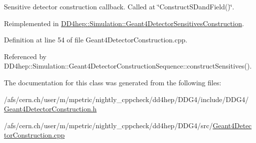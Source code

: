 Sensitive detector construction callback. Called at \char`\"{}ConstructSDandField()\char`\"{}. 

Reimplemented in \hyperlink{class_d_d4hep_1_1_simulation_1_1_geant4_detector_sensitives_construction_ae698013abe689d2e76e1423d5e08f246}{DD4hep::Simulation::Geant4DetectorSensitivesConstruction}.

Definition at line 54 of file Geant4DetectorConstruction.cpp.

Referenced by DD4hep::Simulation::Geant4DetectorConstructionSequence::constructSensitives().

The documentation for this class was generated from the following files:\begin{DoxyCompactItemize}
\item 
/afs/cern.ch/user/m/mpetric/nightly\_\-cppcheck/dd4hep/DDG4/include/DDG4/\hyperlink{_geant4_detector_construction_8h}{Geant4DetectorConstruction.h}\item 
/afs/cern.ch/user/m/mpetric/nightly\_\-cppcheck/dd4hep/DDG4/src/\hyperlink{_geant4_detector_construction_8cpp}{Geant4DetectorConstruction.cpp}\end{DoxyCompactItemize}
